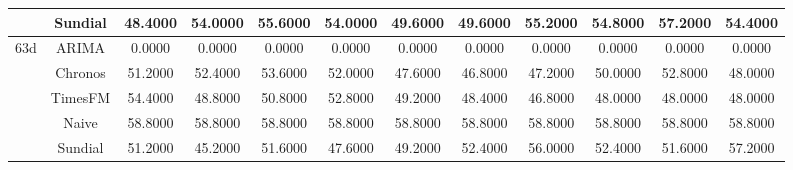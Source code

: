 \begin{table}[H]
{\begin{tabular}{cccccccccccc}
 & Sundial & 48.4000 & 54.0000 & 55.6000 & 54.0000 & 49.6000 & 49.6000 & 55.2000 & 54.8000 & 57.2000 & 54.4000 \\
\midrule
\multirow[c]{5}{*}{63d} & ARIMA & 0.0000 & 0.0000 & 0.0000 & 0.0000 & 0.0000 & 0.0000 & 0.0000 & 0.0000 & 0.0000 & 0.0000 \\
 & Chronos & 51.2000 & 52.4000 & 53.6000 & 52.0000 & 47.6000 & 46.8000 & 47.2000 & 50.0000 & 52.8000 & 48.0000 \\
 & TimesFM & 54.4000 & 48.8000 & 50.8000 & 52.8000 & 49.2000 & 48.4000 & 46.8000 & 48.0000 & 48.0000 & 48.0000 \\
 & Naive & 58.8000 & 58.8000 & 58.8000 & 58.8000 & 58.8000 & 58.8000 & 58.8000 & 58.8000 & 58.8000 & 58.8000 \\
 & Sundial & 51.2000 & 45.2000 & 51.6000 & 47.6000 & 49.2000 & 52.4000 & 56.0000 & 52.4000 & 51.6000 & 57.2000 \\
\bottomrule
\end{tabular}

 }
\end{table}
